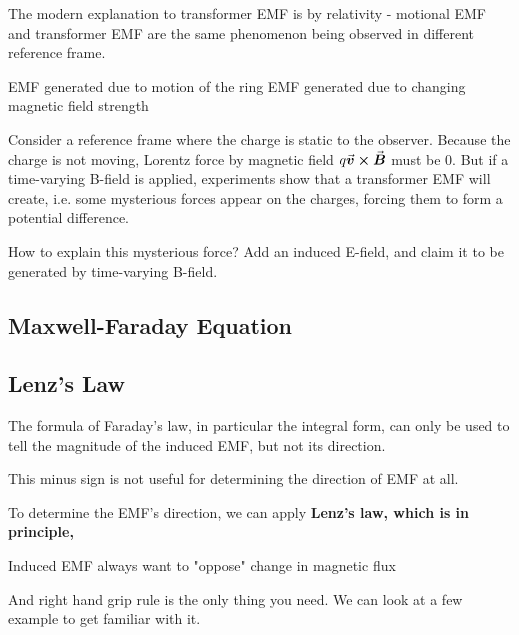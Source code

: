 \documentclass[class=article, crop=false, 12pt]{standalone}
\begin{document}
The modern explanation to transformer EMF is by relativity - 
motional EMF and transformer EMF are the same phenomenon being observed in different reference frame. 


EMF generated due to motion of the ring
EMF generated due to changing magnetic field strength

Consider a reference frame where the charge is static to the observer. 
Because the charge is not moving, 
Lorentz force by magnetic field $q\va*{v}\cross\va*{B}$ must be $0$.
But if a time-varying B-field is applied, 
experiments show that a transformer EMF will create, 
i.e. some mysterious forces appear on the charges, 
forcing them to form a potential difference.

How to explain this mysterious force? 
Add an induced E-field, and claim it to be generated by time-varying B-field.







\subsection{Maxwell-Faraday Equation}

\subsection{Lenz's Law}

The formula of Faraday's law, in particular the integral form,
can only be used to tell the magnitude of the induced EMF, 
but not its direction.

This minus sign is not useful for determining the direction of EMF at all.

To determine the EMF's direction, we can apply \bf{Lenz's law},
which is in principle,
\begin{center}
    Induced EMF always want to "oppose" change in magnetic flux
\end{center}

And right hand grip rule is the only thing you need.
We can look at a few example to get familiar with it.
\end{document}
